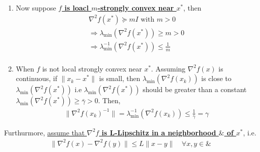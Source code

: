 \documentclass[11pt,a4paper]{article}
\begin{document}
\begin{enumerate}[$\bullet$]
    \item Now suppose \textbf{\underline{$f$ is loacl $m$-strongly convex near $x^*$}}, then
    \begin{equation}
        \begin{aligned}
            \nabla^2 f(x^*)\succeq mI\text{ with }m>0\\
            \Rightarrow	\lambda_{\min}( \nabla^2 f(x^*))\geq m>0\\
            \Rightarrow	\lambda^{-1}_{\min}( \nabla^2 f(x^*))\leq \frac{1}{m}\\
        \end{aligned}
        \nonumber
    \end{equation}
    \item When $f$ is not local strongly convex near $x^*$. Assuming $\nabla^2 f(x)$ is continuous, if $\|x_k-x^*\|$ is small, then $\lambda_{\min}(\nabla^2 f(x_k))$ is close to $\lambda_{\min}(\nabla^2 f(x^*))$ i.e $\lambda_{\min}(\nabla^2 f(x^*))$ should be greater than a constant $\lambda_{\min}(\nabla^2 f(x^*))\geq \bar{\gamma}>0$. Then,
    \begin{equation}
        \begin{aligned}
            \|\nabla^2 f(x_k)^{-1}\|=\lambda^{-1}_{\min}(\nabla^2 f(x_k))\leq \frac{1}{\bar{\gamma}}=\gamma
        \end{aligned}
        \nonumber
    \end{equation}
\end{enumerate}

Furthurmore, \underline{assume that \textbf{$\nabla^2 f$ is L-Lipschitz in a neighborhood $\&$ of $x^*$}}, i.e.
\begin{equation}
    \begin{aligned}
        \|\nabla^2 f(x)-\nabla^2 f(y)\|\leq L\|x-y\|\quad \forall x,y\in \&
    \end{aligned}
    \nonumber
\end{equation}
\end{document}
